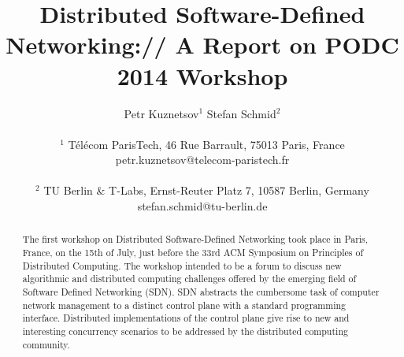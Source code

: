 \documentclass[11pt,pdftex,letter]{article}
\def\SAVESPACE{1}
\begin{document}
\sloppy




\title{Distributed Software-Defined Networking:// A Report on PODC 2014 Workshop }



\author{
Petr Kuznetsov$^{1}$ \quad Stefan Schmid$^{2}$\\
\\
       $^{1}$ T\'el\'ecom ParisTech, 46 Rue Barrault, 75013 Paris, France\\
        petr.kuznetsov@telecom-paristech.fr\\
\\
        $^{2}$ TU Berlin \& T-Labs, Ernst-Reuter Platz 7, 10587 Berlin, Germany\\
	    stefan.schmid@tu-berlin.de}


\date{}


\maketitle


\thispagestyle{empty}





\begin{abstract}

The first workshop on Distributed Software-Defined Networking took
place in Paris, France, on the 15th of July, just before 
the 33rd ACM Symposium on Principles of Distributed Computing. 
The workshop intended to be a forum to discuss new algorithmic and distributed computing challenges offered by the emerging field of Software Defined Networking (SDN). SDN abstracts the cumbersome task of computer network management to a distinct control plane with a standard programming interface. Distributed implementations of the control plane give rise to new and interesting concurrency scenarios to be addressed by the distributed computing community.

\end{abstract}
\end{document}
